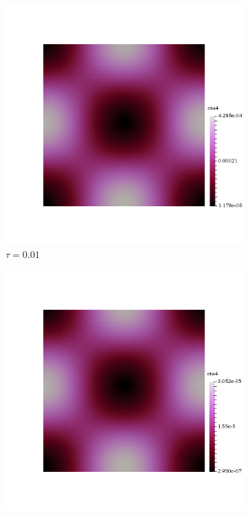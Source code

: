 \begin{figure}[h!]
  \centering
  \begin{subfigure}[b]{0.24\textwidth}
    \includegraphics[width=\textwidth,height=\textheight,keepaspectratio,height=\textheight,keepaspectratio]{figures/2_mpet/biomedical/time/eta4_dt1.png}
    \caption{$\tau=0.01$}
  \end{subfigure}
  \begin{subfigure}[b]{0.24\textwidth}
    \includegraphics[width=\textwidth,height=\textheight,keepaspectratio,height=\textheight,keepaspectratio]{figures/2_mpet/biomedical/time/eta4_dt2.png}

\end{subfigure}
\end{figure}
